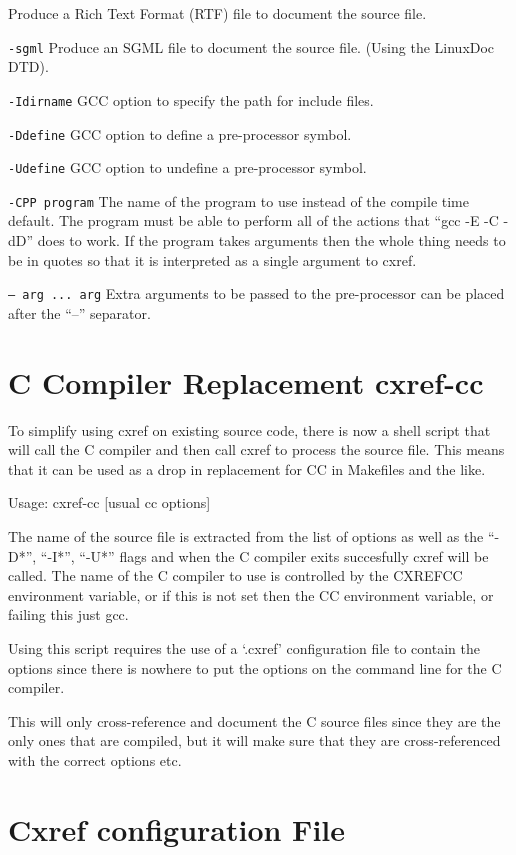 \documentclass{report}
\begin{document}
\begin{list}{}{\leftmargin=1in }
Produce a Rich Text Format (RTF) file to document the source
file.
\item[{\tt -sgml}]
Produce an SGML file to document the source file.  (Using the
LinuxDoc DTD).
\item[{\tt -Idirname}]
GCC option to specify the path for include files.
\item[{\tt -Ddefine}]
GCC option to define a pre-processor symbol.
\item[{\tt -Udefine}]
GCC option to undefine a pre-processor symbol.
\item[{\tt -CPP program}]
The name of the program to use instead of the compile time
default. The program must be able to perform all of the actions
that ``gcc -E -C -dD'' does to work.  If the program takes
arguments then the whole thing needs to be in quotes so that it
is interpreted as a single argument to cxref.
\item[{\tt-- arg ... arg}]
Extra arguments to be passed to the pre-processor can be placed
after the ``--'' separator.
\end{list}

\section{C Compiler Replacement cxref-cc}

To simplify using cxref on existing source code, there is now a shell script
that will call the C compiler and then call cxref to process the source file.
This means that it can be used as a drop in replacement for CC in Makefiles and
the like.

Usage: cxref-cc [usual cc options]

The name of the source file is extracted from the list of options as well as the
``-D*'', ``-I*'', ``-U*'' flags and when the C compiler exits succesfully cxref will
be called.  The name of the C compiler to use is controlled by the CXREFCC
environment variable, or if this is not set then the CC environment variable, or
failing this just gcc.

Using this script requires the use of a `.cxref' configuration file to contain
the options since there is nowhere to put the options on the command line for
the C compiler.

This will only cross-reference and document the C source files since they are
the only ones that are compiled, but it will make sure that they are
cross-referenced with the correct options etc.

\section{Cxref configuration File}
\end{document}
